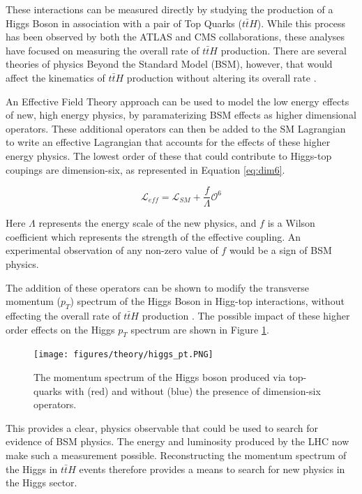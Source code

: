 These interactions can be measured directly by studying the production of a Higgs Boson in association with a pair of Top Quarks ($t\bar{t}H$). While this process has been observed by both the ATLAS \cite{ttH_paper} and CMS \cite{Sirunyan_2018} collaborations, these analyses have focused on measuring the overall rate of $t\bar{t}H$ production. There are several theories of physics Beyond the Standard Model (BSM), however, that would affect the kinematics of $t\bar{t}H$ production without altering its overall rate \cite{Dumont_2013}.

An Effective Field Theory approach can be used to model the low energy effects of new, high energy physics, by paramaterizing BSM effects as higher dimensional operators. These additional operators can then be added to the SM Lagrangian to write an effective Lagrangian that accounts for the effects of these higher energy physics. The lowest order of these that could contribute to Higgs-top coupings are dimension-six, as represented in Equation \ref{eq:dim6}.

\begin{equation}
\label{eq:dim6}
\mathcal{L}_{eff} = \mathcal{L}_{SM} + \frac{f}{\Lambda}\mathcal{O}^6
\end{equation}

Here $\Lambda$ represents the energy scale of the new physics, and $f$ is a Wilson coefficient which represents the strength of the effective coupling. An experimental observation of any non-zero value of $f$ would be a sign of BSM physics.

The addition of these operators can be shown to modify the transverse momentum ($p_T$) spectrum of the Higgs Boson in Higg-top interactions, without effecting the overall rate of $t\bar{t}H$ production \cite{Banerjee_2014}. The possible impact of these higher order effects on the Higgs $p_T$ spectrum are shown in Figure \ref{fig:eft_pt}. 

\begin{figure}[H]
\centering
   \texttt{[image: figures/theory/higgs\_pt.PNG]}
\caption{The momentum spectrum of the Higgs boson produced via top-quarks with (red) and without (blue) the presence of dimension-six operators.}
\label{fig:eft_pt}
\end{figure}


This provides a clear, physics observable that could be used to search for evidence of BSM physics. The energy and luminosity produced by the LHC now make such a measurement possible. Reconstructing the momentum spectrum of the Higgs in $t\bar{t}H$ events therefore provides a means to search for new physics in the Higgs sector.



